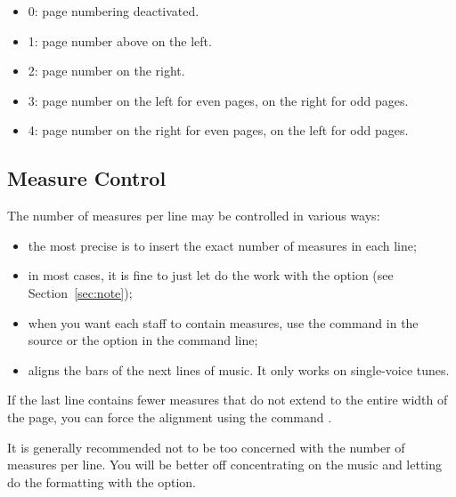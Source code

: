 \documentclass[a4paper,fullpage,12pt]{book}
\begin{document}
\begin{itemize}

  \item 0: page numbering deactivated.
  
  \item 1: page number above on the left.
  
  \item 2: page number on the right.
  
  \item 3: page number on the left for even pages, on the right
  for odd pages.
  
  \item 4: page number on the right for even pages, on the left
  for odd pages.

\end{itemize}


\subsection{Measure Control}

The number of measures per line may be controlled in various ways:

\begin{itemize}
  
  \item the most precise is to insert the exact number of
  measures in each line;
  
  \item in most cases, it is fine to just let \abcm{} do the work with
  the  option (see Section~\ref{sec:note});
  
  \item when you want each staff to contain  measures, use the
  command   in the source or the option
    in the \abcm{} command line;
  
  \item {}  aligns the bars of the next 
   lines of music. It only works on single-voice tunes.  
  
\end{itemize}

If the last line contains fewer measures that do not extend to the
entire width of the page, you can force the alignment using the
command .

It is generally recommended not to be too concerned with the number of
measures per line. You will be better off concentrating on the music
and letting \abcm{} do the formatting with the  option.
\end{document}
